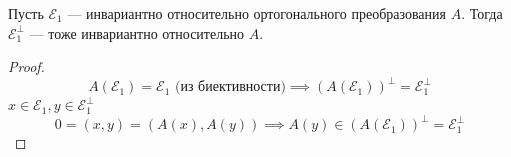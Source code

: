 \documentclass[11pt]{article}
\begin{document}
\begin{theorem}
    Пусть $\mathcal{E}_1$ --- инвариантно относительно ортогонального преобразования $A$. Тогда $\mathcal{E}_1^\perp$ --- тоже инвариантно относительно $A$. 
\end{theorem}

\begin{proof}
    \[ A(\mathcal{E}_1) = \mathcal{E}_1 \text{ (из биективности)} \implies (A(\mathcal{E}_1))^\perp = \mathcal{E}_1^\perp \]
    $x\in \mathcal{E}_1, y\in \mathcal{E}_1^\perp$ 
    \[ 0 = (x,y) = (A(x),A(y)) \implies A(y)\in (A(\mathcal{E}_1))^\perp = \mathcal{E}_1^\perp\]
\end{proof}
\end{document}
